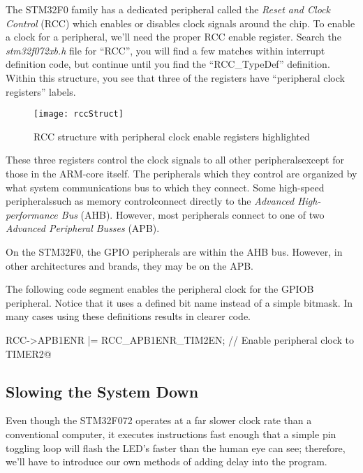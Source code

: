 \documentclass[openany,11pt,fleqn]{book} %
\makeatletter
\newcommand{\ilcode}[1]{
    \begin{center} \parskip=-15pt \colorbox{gray!20!white}{
        \parbox{\columnwidth-2\fboxsep}{
            \lstinline@#1@
        }
    } \end{center}
}
\makeatother
\begin{document}
The STM32F0 family has a dedicated peripheral called the \textit{Reset and Clock Control} (RCC) which enables or disables clock signals around the chip. To enable a clock for a peripheral, we'll need the proper RCC enable register. Search the \textit{stm32f072xb.h} file for ``RCC'', you will find a few matches within interrupt definition code, but continue until you find the ``RCC\_TypeDef'' definition. Within this structure, you see that three of the registers have ``peripheral clock registers'' labels.


\begin{figure}[]
    \centering\texttt{[image: rccStruct]}
    \caption{RCC structure with peripheral clock enable registers highlighted}
    \label{rccStruct}
\end{figure}

These three registers control the clock signals to all other peripherals\textemdash except for those in the ARM-core itself. The peripherals which they control are organized by what system communications bus to which they connect. Some high-speed peripherals\textemdash such as memory control\textemdash connect directly to the \textit{Advanced High-performance Bus} (AHB). However, most peripherals connect to one of two \textit{Advanced Peripheral Busses} (APB).

On the STM32F0, the GPIO peripherals are within the AHB bus. However, in other architectures and brands, they may be on the APB.

\begin{example}
    The following code segment enables the peripheral clock for the GPIOB peripheral. Notice that it uses a defined bit name instead of a simple bitmask. In many cases using these definitions results in clearer code.

    \ilcode{RCC->APB1ENR |= RCC\_APB1ENR\_TIM2EN;    // Enable peripheral clock to TIMER2}
    \smallskip
\end{example}

\subsection{Slowing the System Down}
Even though the STM32F072 operates at a far slower clock rate than a conventional computer, it executes instructions fast enough that a simple pin toggling loop will flash the LED's faster than the human eye can see; therefore, we'll have to introduce our own methods of adding delay into the program.
\end{document}

